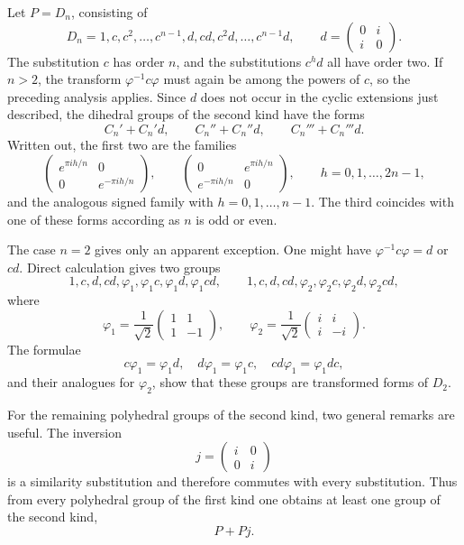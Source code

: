\documentclass[11pt]{article}
\begin{document}
Let \(P=D_n\), consisting of
\begin{equation}\label{eq:62-8d}
 D_n=1,c,c^2,\ldots,c^{n-1},d,cd,c^2d,\ldots,c^{n-1}d,
 \qquad
 d=\begin{pmatrix}0&i\\i&0\end{pmatrix}.
\end{equation}
The substitution \(c\) has order \(n\), and the substitutions \(c^hd\) all have order two.  If \(n>2\), the transform \(\varphi^{-1}c\varphi\) must again be among the powers of \(c\), so the preceding analysis applies.  Since \(d\) does not occur in the cyclic extensions just described, the dihedral groups of the second kind have the forms
\begin{equation}\label{eq:62-9}
 C_n'+C_n'd,
 \qquad
 C_n''+C_n''d,
 \qquad
 C_n'''+C_n'''d.
\end{equation}
Written out, the first two are the families
\[
 \begin{pmatrix}e^{\pi ih/n}&0\\0&e^{-\pi ih/n}\end{pmatrix},
 \qquad
 \begin{pmatrix}0&e^{\pi ih/n}\\e^{-\pi ih/n}&0\end{pmatrix},
 \qquad h=0,1,\ldots,2n-1,
\]
and the analogous signed family with \(h=0,1,\ldots,n-1\).  The third coincides with one of these forms according as \(n\) is odd or even.

The case \(n=2\) gives only an apparent exception.  One might have \(\varphi^{-1}c\varphi=d\) or \(cd\).  Direct calculation gives two groups
\begin{equation}\label{eq:62-11}
 1,c,d,cd,\varphi_1,\varphi_1c,\varphi_1d,\varphi_1cd,
 \qquad
 1,c,d,cd,\varphi_2,\varphi_2c,\varphi_2d,\varphi_2cd,
\end{equation}
where
\[
 \varphi_1=\frac1{\sqrt2}\begin{pmatrix}1&1\\1&-1\end{pmatrix},
 \qquad
 \varphi_2=\frac1{\sqrt2}\begin{pmatrix}i&i\\i&-i\end{pmatrix}.
\]
The formulae
\[
 c\varphi_1=\varphi_1d,
 \quad d\varphi_1=\varphi_1c,
 \quad cd\varphi_1=\varphi_1dc,
\]
and their analogues for \(\varphi_2\), show that these groups are transformed forms of \(D_2\).

For the remaining polyhedral groups of the second kind, two general remarks are useful.  The inversion
\begin{equation}\label{eq:62-inversion}
 j=\begin{pmatrix}i&0\\0&i\end{pmatrix}
\end{equation}
is a similarity substitution and therefore commutes with every substitution.  Thus from every polyhedral group of the first kind one obtains at least one group of the second kind,
\begin{equation}\label{eq:62-12}
 P+Pj.
\end{equation}
\end{document}
